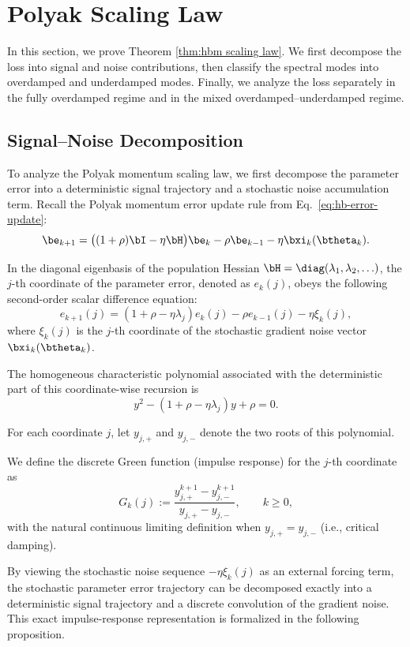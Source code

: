 \newpage
\section{Polyak Scaling Law}

\label{app:hbm scaling law}
In this section, we prove Theorem \ref{thm:hbm scaling law}. We first decompose the loss into signal and noise contributions, then classify the spectral modes into overdamped and underdamped modes. Finally, we analyze the loss separately in the fully overdamped regime and in the mixed overdamped--underdamped regime. 


\subsection{Signal--Noise Decomposition} 
\label{app:pol_signal_noise_decomp}

To analyze the Polyak momentum scaling law, we first decompose the parameter error into a deterministic signal trajectory and a stochastic noise accumulation term. Recall the Polyak momentum error update rule from Eq.~\eqref{eq:hb-error-update}:
\[
    \be_{k+1}
    =
    \bigl((1+\rho)\bI-\eta\bH\bigr)\be_k
    -\rho\be_{k-1}
    -\eta\bxi_k(\btheta_k).
\]

In the diagonal eigenbasis of the population Hessian $\bH = \diag(\lambda_1,\lambda_2,\ldots)$, the $j$-th coordinate of the parameter error, denoted as $e_k(j)$, obeys the following second-order scalar difference equation:
\[
    e_{k+1}(j)
    =
    (1+\rho-\eta\lambda_j)e_k(j)
    -\rho e_{k-1}(j)
    -\eta\xi_k(j),
\]
where $\xi_k(j)$ is the $j$-th coordinate of the stochastic gradient noise vector $\bxi_k(\btheta_k)$. 

The homogeneous characteristic polynomial associated with the deterministic part of this coordinate-wise recursion is
\[
    y^2-(1+\rho-\eta\lambda_j)y+\rho=0.
\]

For each coordinate $j$, let $y_{j,+}$ and $y_{j,-}$ denote the two roots of this polynomial. 

We define the discrete Green function (impulse response) for the $j$-th coordinate as
\[
    G_k(j):=\frac{y_{j,+}^{k+1}-y_{j,-}^{k+1}}{y_{j,+}-y_{j,-}},
    \qquad k\ge 0,
\]
with the natural continuous limiting definition when $y_{j,+}=y_{j,-}$ (i.e., critical damping). 

By viewing the stochastic noise sequence $-\eta\xi_k(j)$ as an external forcing term, the stochastic parameter error trajectory can be decomposed exactly into a deterministic signal trajectory and a discrete convolution of the gradient noise. This exact impulse-response representation is formalized in the following proposition.

